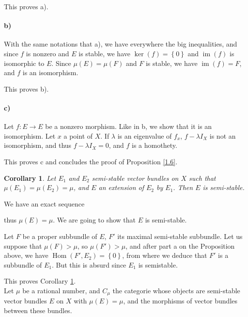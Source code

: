 \documentclass[12pt,a4paper]{book}
\DeclareMathOperator\Hom{Hom}
\DeclareMathOperator\im{im}
\newtheorem{corol}[thm]{Corollary}
\theoremstyle{definition} \newtheorem{defn}[thm]{Definition}
\theoremstyle{definition} \newtheorem{ejs}[thm]{Examples}
\theoremstyle{definition} \newtheorem{ej}[thm]{Example}
\begin{document}
      This proves a).

      \paragraph{\rm b)} With the same notations that a), we have everywhere the big inequalities, and since $f$ is nonzero and $E$ is stable, we have $\ker(f)=\left\{ 0 \right\}$ and $\im(f)$ is isomorphic to $E$. Since $\mu(E)=\mu(F)$ and $F$ is stable, we have $\im(f)=F$, and $f$ is an isomorphism.

      This proves b).

      \paragraph{\rm c)} Let $f:E\rightarrow E$ be a nonzero morphism. Like in b, we show that it is an isomorphism. Let $x$ a point of $X$. If $\lambda$ is an eigenvalue of $f_x$, $f-\lambda I_X$ is not an isomorphism, and thus $f-\lambda I_X=0$, and $f$ is a homothety.

      This proves c and concludes the proof of Proposition \ref{1.6}. \\

      \begin{corol}\label{1.7}
	Let $E_1$ and $E_2$ semi-stable vector bundles on $X$ such that $\mu(E_1)=\mu(E_2)=\mu$, and $E$ an extension of $E_2$ by $E_1$. Then $E$ is semi-stable.
      \end{corol}
       We have an exact sequence
      \begin{center}
      \end{center}
      thus $\mu(E)=\mu$. We are going to show that $E$ is semi-stable.

      Let $F$ be a proper subbundle of $E$, $F'$ its maximal semi-stable subbundle. Let us suppose that $\mu(F)>\mu$, so $\mu(F')>\mu$, and after part a on the Proposition above, we have $\Hom(F',E_2)=\left\{ 0 \right\}$, from where we deduce that $F'$ is a subbundle of $E_1$. But this is absurd since $E_1$ is semistable.
      
      This proves Corollary \ref{1.7}. \\

      Let $\mu$ be a rational number, and $C_\mu$ the categorie whose objects are semi-stable vector bundles $E$ on $X$ with $\mu(E)=\mu$, and the morphisms of vector bundles between these bundles.
      
\end{document}
